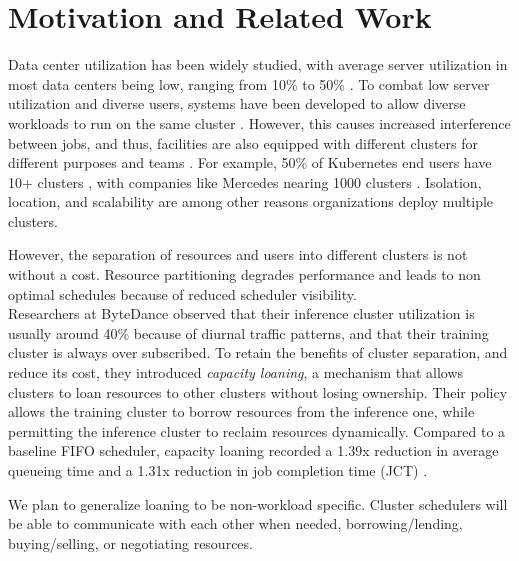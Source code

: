 \section{Motivation and Related Work}
Data center utilization has been widely studied, with average server utilization in most data centers being low, 
ranging from 10\% to 50\%
\cite{lo_heracles_2015}. 
To combat low server utilization and diverse users, systems have been developed to allow diverse workloads to run 
on the same cluster \cite{bhattacharya_hierarchical_2013, hindman_mesos_nodate}. 
However, this causes increased interference between jobs, and thus, 
facilities are also equipped with different clusters for different purposes and teams \cite{patel_what_2022, li_lyra_2023}. 
For example, 50\% of Kubernetes \cite{verma_large-scale_2015}
end users have 10+ clusters \cite{noauthor_cncf_2023} 
, with companies like Mercedes nearing 1000 clusters \cite{noauthor_mercedes-benz_2023}.
Isolation, location, and scalability are among other reasons organizations deploy multiple clusters.

However, the separation of resources and users into different clusters is not without a cost. 
Resource partitioning degrades performance %
and leads to non optimal schedules because of reduced scheduler visibility.\\ %

Researchers at ByteDance observed that their inference cluster utilization is usually around 40\% because 
of diurnal traffic patterns, and that their training cluster is always over subscribed. 
To retain the benefits of cluster separation, and reduce its cost, they introduced \textit{capacity loaning}, 
a mechanism that allows clusters to loan resources to other clusters without losing ownership.
Their policy allows the training cluster to borrow resources from the inference one, while permitting the 
inference cluster to reclaim resources dynamically. 
Compared to a baseline FIFO scheduler, capacity loaning recorded a 1.39x reduction in average queueing time and a 1.31x 
reduction in job completion time (JCT) \cite{li_lyra_2023}.

We plan to generalize loaning to be non-workload specific. Cluster schedulers will be able to communicate 
with each other when needed, borrowing/lending, buying/selling, or negotiating resources. %
